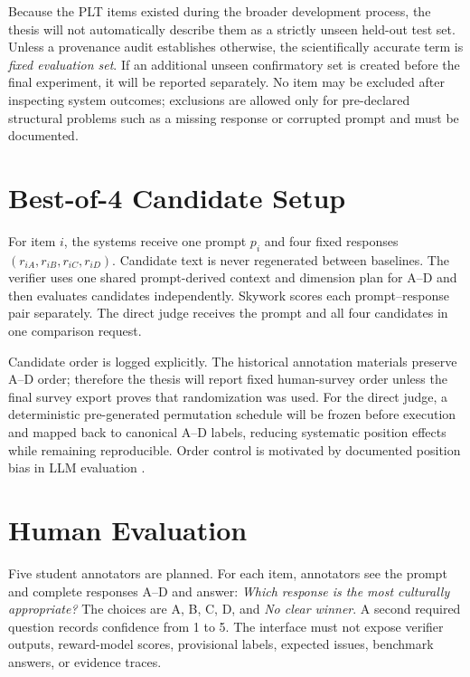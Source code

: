 Because the PLT items existed during the broader development process, the thesis will not automatically describe them as a strictly unseen held-out test set. Unless a provenance audit establishes otherwise, the scientifically accurate term is \emph{fixed evaluation set}. If an additional unseen confirmatory set is created before the final experiment, it will be reported separately. No item may be excluded after inspecting system outcomes; exclusions are allowed only for pre-declared structural problems such as a missing response or corrupted prompt and must be documented.

\section{Best-of-4 Candidate Setup}

For item $i$, the systems receive one prompt $p_i$ and four fixed responses $(r_{iA},r_{iB},r_{iC},r_{iD})$. Candidate text is never regenerated between baselines. The verifier uses one shared prompt-derived context and dimension plan for A--D and then evaluates candidates independently. Skywork scores each prompt--response pair separately. The direct judge receives the prompt and all four candidates in one comparison request.

Candidate order is logged explicitly. The historical annotation materials preserve A--D order; therefore the thesis will report fixed human-survey order unless the final survey export proves that randomization was used. For the direct judge, a deterministic pre-generated permutation schedule will be frozen before execution and mapped back to canonical A--D labels, reducing systematic position effects while remaining reproducible. Order control is motivated by documented position bias in LLM evaluation \parencite{wang2024notfairevaluators}.

\section{Human Evaluation}
\label{sec:human-eval}

Five student annotators are planned. For each item, annotators see the prompt and complete responses A--D and answer: \emph{Which response is the most culturally appropriate?} The choices are A, B, C, D, and \emph{No clear winner}. A second required question records confidence from 1 to 5. The interface must not expose verifier outputs, reward-model scores, provisional labels, expected issues, benchmark answers, or evidence traces.

